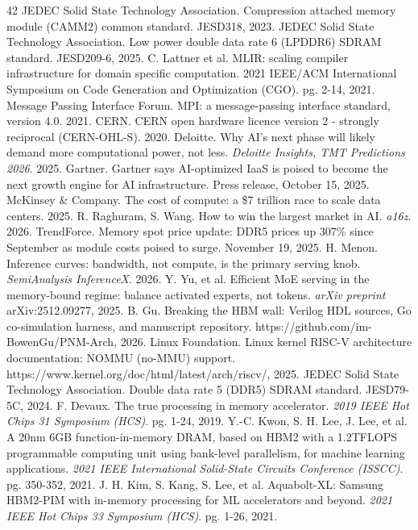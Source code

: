 \documentclass[12pt,onecolumn]{article}
\begin{document}
\begin{thebibliography}{42}
 JEDEC Solid State Technology Association. Compression attached memory module (CAMM2) common standard. JESD318, 2023.
 JEDEC Solid State Technology Association. Low power double data rate 6 (LPDDR6) SDRAM standard. JESD209-6, 2025.
 C. Lattner et al. MLIR: scaling compiler infrastructure for domain specific computation. 2021 IEEE/ACM International Symposium on Code Generation and Optimization (CGO). pg. 2-14, 2021.
 Message Passing Interface Forum. MPI: a message-passing interface standard, version 4.0. 2021.
 CERN. CERN open hardware licence version 2 - strongly reciprocal (CERN-OHL-S). 2020.
 Deloitte. Why AI's next phase will likely demand more computational power, not less. \textit{Deloitte Insights, TMT Predictions 2026}. 2025.
 Gartner. Gartner says AI-optimized IaaS is poised to become the next growth engine for AI infrastructure. Press release, October 15, 2025.
 McKinsey \& Company. The cost of compute: a \$7 trillion race to scale data centers. 2025.
 R. Raghuram, S. Wang. How to win the largest market in AI. \textit{a16z}. 2026.
 TrendForce. Memory spot price update: DDR5 prices up 307\% since September as module costs poised to surge. November 19, 2025.
 H. Menon. Inference curves: bandwidth, not compute, is the primary serving knob. \textit{SemiAnalysis InferenceX}. 2026.
 Y. Yu, et al. Efficient MoE serving in the memory-bound regime: balance activated experts, not tokens. \textit{arXiv preprint} arXiv:2512.09277, 2025.
 B. Gu. Breaking the HBM wall: Verilog HDL sources, Go co-simulation harness, and manuscript repository. https://github.com/im-BowenGu/PNM-Arch, 2026.
 Linux Foundation. Linux kernel RISC-V architecture documentation: NOMMU (no-MMU) support. https://www.kernel.org/doc/html/latest/arch/riscv/, 2025.
 JEDEC Solid State Technology Association. Double data rate 5 (DDR5) SDRAM standard. JESD79-5C, 2024.
 F. Devaux. The true processing in memory accelerator. \textit{2019 IEEE Hot Chips 31 Symposium (HCS)}. pg. 1-24, 2019.
 Y.-C. Kwon, S. H. Lee, J. Lee, et al. A 20nm 6GB function-in-memory DRAM, based on HBM2 with a 1.2TFLOPS programmable computing unit using bank-level parallelism, for machine learning applications. \textit{2021 IEEE International Solid-State Circuits Conference (ISSCC)}. pg. 350-352, 2021.
 J. H. Kim, S. Kang, S. Lee, et al. Aquabolt-XL: Samsung HBM2-PIM with in-memory processing for ML accelerators and beyond. \textit{2021 IEEE Hot Chips 33 Symposium (HCS)}. pg. 1-26, 2021.

\end{thebibliography}
\end{document}
